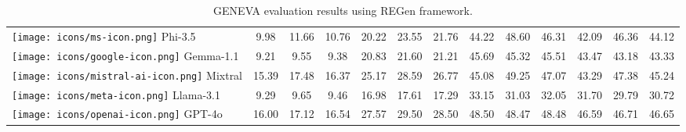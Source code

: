 \begin{table*}[h!]
\begin{tabular}{l|ccc|ccc|ccc|ccc}
\texttt{[image: icons/ms-icon.png]} Phi-3.5 & 9.98 & 11.66 & 10.76 & 20.22 & 23.55 & 21.76 & 44.22 & 48.60 & 46.31 & 42.09 & 46.36 & 44.12 \\
\texttt{[image: icons/google-icon.png]} Gemma-1.1 & 9.21 & 9.55 & 9.38 & 20.83 & 21.60 & 21.21 & 45.69 & 45.32 & 45.51 & 43.47 & 43.18 & 43.33 \\
\texttt{[image: icons/mistral-ai-icon.png]} Mixtral & 15.39 & 17.48 & 16.37 & 25.17 & 28.59 & 26.77 & 45.08 & 49.25 & 47.07 & 43.29 & 47.38 & 45.24 \\
\texttt{[image: icons/meta-icon.png]} Llama-3.1 & 9.29 & 9.65 & 9.46 & 16.98 & 17.61 & 17.29 & 33.15 & 31.03 & 32.05 & 31.70 & 29.79 & 30.72\\
\texttt{[image: icons/openai-icon.png]} GPT-4o & 16.00 & 17.12 & 16.54 & 27.57 & 29.50 & 28.50 & 48.50 & 48.47 & 48.48 & 46.59 & 46.71 & 46.65 \\

\bottomrule 
\end{tabular}
\caption{GENEVA evaluation results using REGen framework.}
\label{GENEVA-all-results}
\end{table*}

